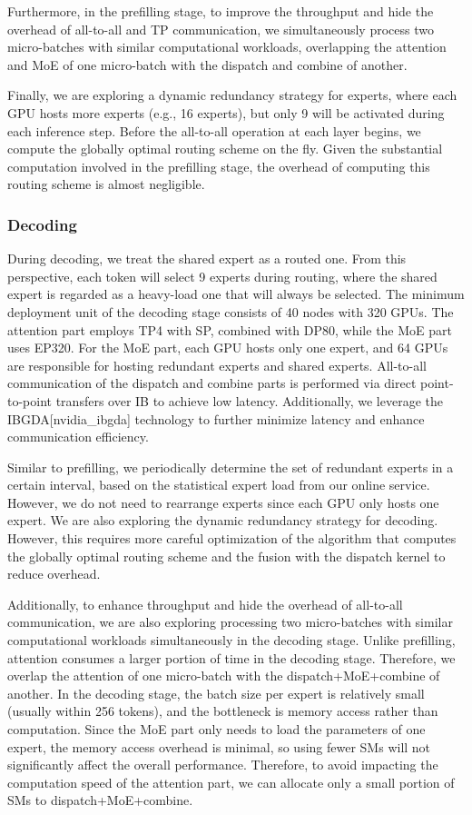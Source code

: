 \documentclass[11pt,a4paper]{article}
\begin{document}
Furthermore, in the prefilling stage, to improve the throughput and hide the overhead of all-to-all and TP communication, we simultaneously process two micro-batches with similar computational workloads, overlapping the attention and MoE of one micro-batch with the dispatch and combine of another.

Finally, we are exploring a dynamic redundancy strategy for experts, where each GPU hosts more experts (e.g., 16 experts), but only 9 will be activated during each inference step. 
Before the all-to-all operation at each layer begins, we compute the globally optimal routing scheme on the fly. 
Given the substantial computation involved in the prefilling stage, the overhead of computing this routing scheme is almost negligible.

\subsubsection{Decoding}

During decoding, we treat the shared expert as a routed one. 
From this perspective, each token will select 9 experts during routing, where the shared expert is regarded as a heavy-load one that will always be selected. 
The minimum deployment unit of the decoding stage consists of 40 nodes with 320 GPUs. 
The attention part employs TP4 with SP, combined with DP80, while the MoE part uses EP320. 
For the MoE part, each GPU hosts only one expert, and 64 GPUs are responsible for hosting redundant experts and shared experts.
All-to-all communication of the dispatch and combine parts is performed via direct point-to-point transfers over IB to achieve low latency. 
Additionally, we leverage the IBGDA[nvidia\_ibgda] technology to further minimize latency and enhance communication efficiency.

Similar to prefilling, we periodically determine the set of redundant experts in a certain interval, based on the statistical expert load from our online service. 
However, we do not need to rearrange experts since each GPU only hosts one expert. 
We are also exploring the dynamic redundancy strategy for decoding. 
However, this requires more careful optimization of the algorithm that computes the globally optimal routing scheme and the fusion with the dispatch kernel to reduce overhead.

Additionally, to enhance throughput and hide the overhead of all-to-all communication, we are also exploring processing two micro-batches with similar computational workloads simultaneously in the decoding stage. 
Unlike prefilling, attention consumes a larger portion of time in the decoding stage. Therefore, we overlap the attention of one micro-batch with the dispatch+MoE+combine of another.
In the decoding stage, the batch size per expert is relatively small (usually within 256 tokens), and the bottleneck is memory access rather than computation. 
Since the MoE part only needs to load the parameters of one expert, the memory access overhead is minimal, so using fewer SMs will not significantly affect the overall performance.
Therefore, to avoid impacting the computation speed of the attention part, we can allocate only a small portion of SMs to dispatch+MoE+combine.
\end{document}
